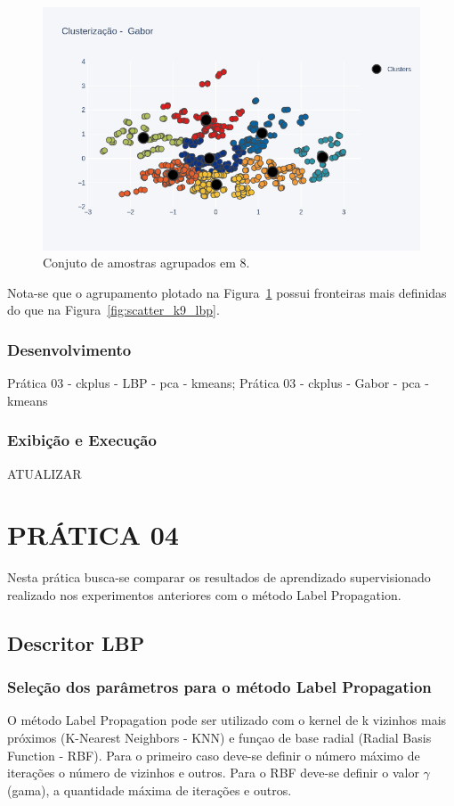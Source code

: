 \documentclass[a4paper, 12 pt, conference]{ieeeconf}  %
\begin{document}
\begin{figure}[!htbp]
	\centering
	\includegraphics[width=1.0\linewidth,clip=true,trim=0cm 0cm 0cm 0cm, keepaspectratio=true]{scatter_k8_gabor.png}
	\caption{Conjuto de amostras agrupados em 8.}
	\label{fig:scatter_k8_gabor}
\end{figure}

Nota-se que o agrupamento plotado na Figura~\ref{fig:scatter_k8_gabor} possui fronteiras mais definidas do que na Figura~\ref{fig:scatter_k9_lbp}.

\subsubsection{Desenvolvimento} Prática 03 - ckplus - LBP - pca - kmeans; Prática 03 - ckplus - Gabor - pca - kmeans
\subsubsection{Exibição e Execução} ATUALIZAR

\section{PRÁTICA 04}
\label{pratica04}
Nesta prática busca-se comparar os resultados de aprendizado supervisionado realizado nos experimentos anteriores com o método Label Propagation.

\subsection{Descritor LBP}
\subsubsection{Seleção dos parâmetros para o método Label Propagation}
O método Label Propagation pode ser utilizado com o kernel de k vizinhos mais próximos (K-Nearest Neighbors - KNN) e funçao de base radial (Radial Basis Function - RBF). Para o  primeiro caso deve-se definir o número máximo de iterações o número de vizinhos e outros. Para o RBF deve-se definir o valor $\gamma$ (gama), a quantidade máxima de iterações e outros.
\end{document}
